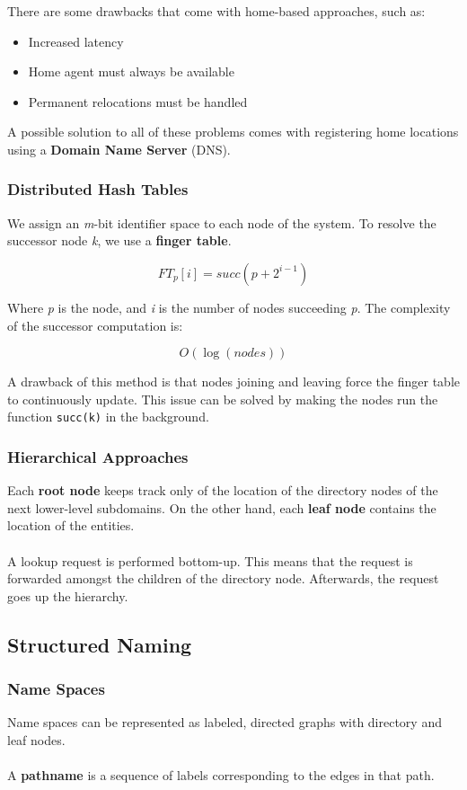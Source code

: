 \documentclass{article}
\begin{document}
\noindent There are some drawbacks that come with home-based approaches, such as:

\begin{itemize}
	\item Increased latency
	\item Home agent must always be available
	\item Permanent relocations must be handled
\end{itemize}

\noindent A possible solution to all of these problems comes with registering home locations using a \textbf{Domain Name Server} (DNS).

\subsubsection{Distributed Hash Tables}
We assign an \textit{m}-bit identifier space to each node of the system. To resolve the successor node \textit{k}, we use a \textbf{finger table}.

\[ FT_p[i] = succ(p + 2^{i-1}) \]

\noindent Where \textit{p} is the node, and \textit{i} is the number of nodes succeeding \textit{p}. The complexity of the successor computation is:

\[ O(\log (nodes)) \]

\noindent A drawback of this method is that nodes joining and leaving force the finger table to continuously update. This issue can be solved by making the nodes run the function \verb|succ(k)| in the background.

\subsubsection{Hierarchical Approaches}
Each \textbf{root node} keeps track only of the location of the directory nodes of the next lower-level subdomains. On the other hand, each \textbf{leaf node} contains the location of the entities. \\ \\
A lookup request is performed bottom-up. This means that the request is forwarded amongst the children of the directory node. Afterwards, the request goes up the hierarchy.

\subsection{Structured Naming}
\subsubsection{Name Spaces}
Name spaces can be represented as labeled, directed graphs with directory and leaf nodes. \\ \\
A \textbf{pathname} is a sequence of labels corresponding to the edges in that path.
\end{document}
